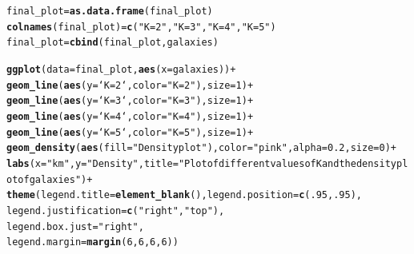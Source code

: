 \documentclass{article}\usepackage[]{graphicx}\usepackage[]{color}
\makeatletter
\newcommand{\hlnum}[1]{\textcolor[rgb]{0.686,0.059,0.569}{#1}}%
\newcommand{\hlstr}[1]{\textcolor[rgb]{0.192,0.494,0.8}{#1}}%
\newcommand{\hlopt}[1]{\textcolor[rgb]{0,0,0}{#1}}%
\newcommand{\hlstd}[1]{\textcolor[rgb]{0.345,0.345,0.345}{#1}}%
\newcommand{\hlkwb}[1]{\textcolor[rgb]{0.69,0.353,0.396}{#1}}%
\newcommand{\hlkwc}[1]{\textcolor[rgb]{0.333,0.667,0.333}{#1}}%
\newcommand{\hlkwd}[1]{\textcolor[rgb]{0.737,0.353,0.396}{\textbf{#1}}}%
\newenvironment{kframe}{%
 \def\at@end@of@kframe{}%
 \ifinner\ifhmode%
  \def\at@end@of@kframe{\end{minipage}}%
  \begin{minipage}{\columnwidth}%
 \fi\fi%
 \def\FrameCommand##1{\hskip\@totalleftmargin \hskip-\fboxsep
 \colorbox{shadecolor}{##1}\hskip-\fboxsep
     \hskip-\linewidth \hskip-\@totalleftmargin \hskip\columnwidth}%
 \MakeFramed {\advance\hsize-\width
   \@totalleftmargin\z@ \linewidth\hsize
   \@setminipage}}%
 {\par\unskip\endMakeFramed%
 \at@end@of@kframe}
\newenvironment{knitrout}{}{} %
\makeatother
\begin{document}
\begin{knitrout}
\begin{kframe}
{\ttfamily\noindent\bfseries\color{errorcolor}{\#\# Error: `data` must be a data frame, or other object coercible by `fortify()`, not a numeric vector}}\begin{alltt}
\hlstd{final_plot} \hlkwb{=} \hlkwd{as.data.frame}\hlstd{(final_plot)}
\hlkwd{colnames}\hlstd{(final_plot)} \hlkwb{=} \hlkwd{c}\hlstd{(}\hlstr{"K = 2"}\hlstd{,} \hlstr{"K = 3"}\hlstd{,} \hlstr{"K = 4"}\hlstd{,} \hlstr{"K = 5"}\hlstd{)}
\hlstd{final_plot} \hlkwb{=} \hlkwd{cbind}\hlstd{(final_plot, galaxies)}

\hlkwd{ggplot}\hlstd{(}\hlkwc{data} \hlstd{= final_plot,} \hlkwd{aes}\hlstd{(}\hlkwc{x} \hlstd{= galaxies))} \hlopt{+}
  \hlkwd{geom_line}\hlstd{(}\hlkwd{aes}\hlstd{(}\hlkwc{y} \hlstd{= `K = 2`,} \hlkwc{color} \hlstd{=} \hlstr{"K = 2"}\hlstd{),} \hlkwc{size} \hlstd{=} \hlnum{1}\hlstd{)} \hlopt{+}
  \hlkwd{geom_line}\hlstd{(}\hlkwd{aes}\hlstd{(}\hlkwc{y} \hlstd{= `K = 3`,} \hlkwc{color} \hlstd{=} \hlstr{"K = 3"}\hlstd{),} \hlkwc{size} \hlstd{=} \hlnum{1}\hlstd{)} \hlopt{+}
  \hlkwd{geom_line}\hlstd{(}\hlkwd{aes}\hlstd{(}\hlkwc{y} \hlstd{= `K = 4`,} \hlkwc{color} \hlstd{=} \hlstr{"K = 4"}\hlstd{),} \hlkwc{size} \hlstd{=} \hlnum{1}\hlstd{)} \hlopt{+}
  \hlkwd{geom_line}\hlstd{(}\hlkwd{aes}\hlstd{(}\hlkwc{y} \hlstd{= `K = 5`,} \hlkwc{color} \hlstd{=} \hlstr{"K = 5"}\hlstd{),} \hlkwc{size} \hlstd{=} \hlnum{1}\hlstd{)} \hlopt{+}
  \hlkwd{geom_density}\hlstd{(}\hlkwd{aes}\hlstd{(}\hlkwc{fill} \hlstd{=} \hlstr{"Density plot"}\hlstd{),} \hlkwc{color} \hlstd{=} \hlstr{"pink"}\hlstd{,} \hlkwc{alpha} \hlstd{=} \hlnum{0.2}\hlstd{,} \hlkwc{size} \hlstd{=} \hlnum{0}\hlstd{)} \hlopt{+}
  \hlkwd{labs}\hlstd{(}\hlkwc{x} \hlstd{=} \hlstr{"km"}\hlstd{,} \hlkwc{y} \hlstd{=} \hlstr{"Density"}\hlstd{,}\hlkwc{title}\hlstd{=}\hlstr{"Plot of different values of K and the density plot of galaxies"}\hlstd{)} \hlopt{+}
  \hlkwd{theme}\hlstd{(}\hlkwc{legend.title} \hlstd{=} \hlkwd{element_blank}\hlstd{(),}\hlkwc{legend.position} \hlstd{=} \hlkwd{c}\hlstd{(}\hlnum{.95}\hlstd{,} \hlnum{.95}\hlstd{),}
        \hlkwc{legend.justification} \hlstd{=} \hlkwd{c}\hlstd{(}\hlstr{"right"}\hlstd{,} \hlstr{"top"}\hlstd{),}
        \hlkwc{legend.box.just} \hlstd{=} \hlstr{"right"}\hlstd{,}
        \hlkwc{legend.margin} \hlstd{=} \hlkwd{margin}\hlstd{(}\hlnum{6}\hlstd{,} \hlnum{6}\hlstd{,} \hlnum{6}\hlstd{,} \hlnum{6}\hlstd{))}
\end{alltt}
\end{kframe}

\end{knitrout}
\end{document}
